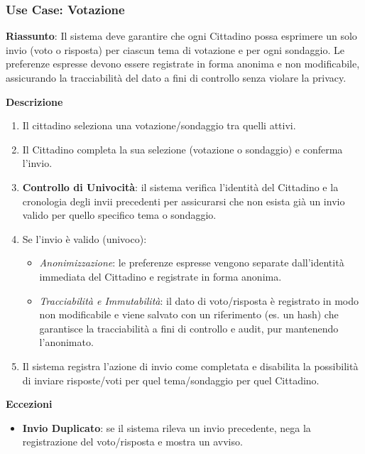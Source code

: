 \documentclass{article}
\begin{document}
\subsubsection*{Use Case: Votazione}

\textbf{Riassunto}: Il sistema deve garantire che ogni Cittadino possa esprimere un solo invio (voto o risposta) per ciascun tema di votazione e per ogni sondaggio. Le preferenze espresse devono essere registrate in forma anonima e non modificabile, assicurando la tracciabilità del dato a fini di controllo senza violare la privacy.

\textbf{Descrizione}
\begin{enumerate}
    \item Il cittadino seleziona una votazione/sondaggio tra quelli attivi.
    \item Il Cittadino completa la sua selezione (votazione o sondaggio) e conferma l'invio.
    \item \textbf{Controllo di Univocità}: il sistema verifica l'identità del Cittadino e la cronologia degli invii precedenti per assicurarsi che non esista già un invio valido per quello specifico tema o sondaggio.
    \item Se l'invio è valido (univoco):
    \begin{itemize}
        \item \textit{Anonimizzazione}: le preferenze espresse vengono separate dall'identità immediata del Cittadino e registrate in forma anonima.
        \item \textit{Tracciabilità e Immutabilità}: il dato di voto/risposta è registrato in modo non modificabile e viene salvato con un riferimento (es. un hash) che garantisce la tracciabilità a fini di controllo e audit, pur mantenendo l'anonimato.
    \end{itemize}
    \item Il sistema registra l'azione di invio come completata e disabilita la possibilità di inviare risposte/voti per quel tema/sondaggio per quel Cittadino.
\end{enumerate}

\textbf{Eccezioni}
\begin{itemize}
    \item \textbf{Invio Duplicato}: se il sistema rileva un invio precedente, nega la registrazione del voto/risposta e mostra un avviso.
\end{itemize}

\end{document}
